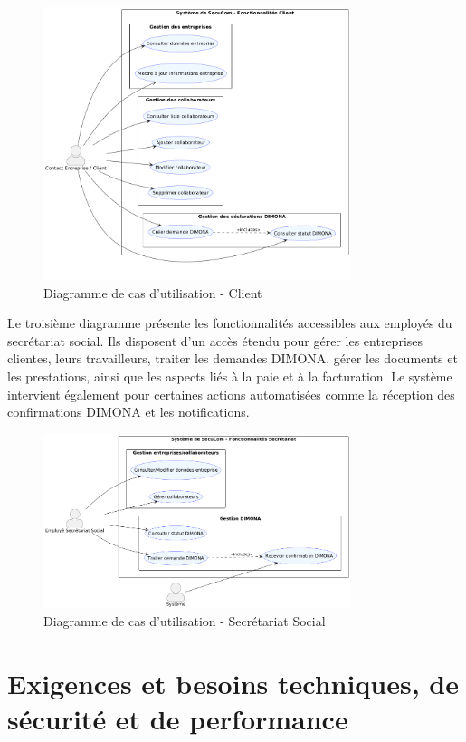 \documentclass[12pt,a4paper]{report}
\begin{document}
\begin{figure}[h]
\centering
\includegraphics[width=0.8\textwidth]{ClientUC.png}
\caption{Diagramme de cas d'utilisation - Client}
\end{figure}

Le troisième diagramme présente les fonctionnalités accessibles aux employés du secrétariat social. Ils disposent d'un accès étendu pour gérer les entreprises clientes, leurs travailleurs, traiter les demandes DIMONA, gérer les documents et les prestations, ainsi que les aspects liés à la paie et à la facturation. Le système intervient également pour certaines actions automatisées comme la réception des confirmations DIMONA et les notifications.

\begin{figure}[h]
\centering
\includegraphics[width=0.8\textwidth]{SecretariatUC.png}
\caption{Diagramme de cas d'utilisation - Secrétariat Social}
\end{figure}

\section{Exigences et besoins techniques, de sécurité et de performance}
\end{document}
